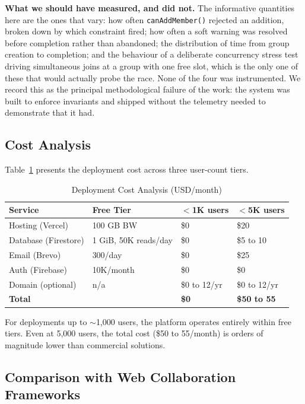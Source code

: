 \documentclass[11pt,a4paper]{article}
\theoremstyle{plain}
\theoremstyle{definition}
\theoremstyle{remark}
\begin{document}
\textbf{What we should have measured, and did not.} The informative quantities here are the ones that vary: how often \texttt{canAddMember()} rejected an addition, broken down by which constraint fired; how often a soft warning was resolved before completion rather than abandoned; the distribution of time from group creation to completion; and the behaviour of a deliberate concurrency stress test driving simultaneous joins at a group with one free slot, which is the only one of these that would actually probe the race. None of the four was instrumented. We record this as the principal methodological failure of the work: the system was built to enforce invariants and shipped without the telemetry needed to demonstrate that it had.

\subsection{Cost Analysis}

Table~\ref{tab:cost} presents the deployment cost across three user-count tiers.

\begin{table}[htbp]
\centering
\caption{Deployment Cost Analysis (USD/month)}
\label{tab:cost}
\small
\renewcommand{\arraystretch}{1.15}
\begin{tabular}{@{}llll@{}}
\toprule
\textbf{Service} & \textbf{Free Tier} & $<$\textbf{1K users} & $<$\textbf{5K users} \\
\midrule
Hosting (Vercel) & 100 GB BW & \$0 & \$20 \\
Database (Firestore) & 1 GiB, 50K reads/day & \$0 & \$5 to 10 \\
Email (Brevo) & 300/day & \$0 & \$25 \\
Auth (Firebase) & 10K/month & \$0 & \$0 \\
Domain (optional) & n/a & \$0 to 12/yr & \$0 to 12/yr \\
\midrule
\textbf{Total} & & \textbf{\$0} & \textbf{\$50 to 55} \\
\bottomrule
\end{tabular}
\end{table}

For deployments up to $\sim$1,000 users, the platform operates entirely within free tiers. Even at 5,000 users, the total cost (\$50 to 55/month) is orders of magnitude lower than commercial solutions.

\subsection{Comparison with Web Collaboration Frameworks}
\end{document}
